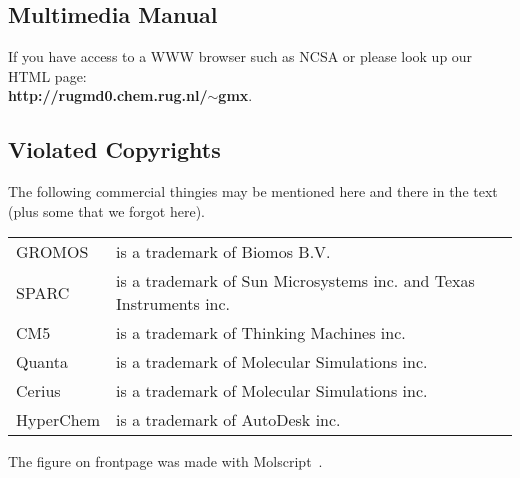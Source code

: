 \documentclass[11pt,dvips]{book}
\newcommand{\wwwpage}{\bf http://rugmd0.chem.rug.nl/$\sim$gmx}
\begin{document}
\newpage
\subsection*{Multimedia Manual}
If you  have access to a WWW browser such as NCSA 
or 
please look up
our HTML page: \\
{\wwwpage}.

\subsection*{Violated Copyrights}
The following commercial thingies may be mentioned here and there in the
text (plus some that we forgot here).
\begin{table}[h]
\begin{tabularx}{\linewidth}{lX}
\hline
GROMOS    & is a trademark of Biomos B.V.\\
SPARC     & is a trademark of Sun Microsystems inc. and Texas Instruments inc.\\
CM5       & is a trademark of Thinking Machines inc.\\
Quanta    & is a trademark of Molecular Simulations inc.\\
Cerius    & is a trademark of Molecular Simulations inc.\\
HyperChem & is a trademark of AutoDesk inc.\\
\hline
\end{tabularx}
\end{table}

The figure on frontpage was made with Molscript~\cite{Kraulis91}.

%
%
\tableofcontents
\listoffigures
\listoftables

%
%
\newpage
\setcounter{page}{1}







%



%
%
\appendix






%
%



%
%
\printindex
\end{document}
